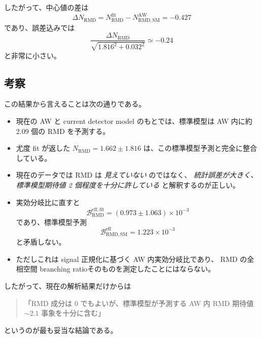\documentclass[a4paper,11pt]{jsarticle}
\begin{document}
したがって、中心値の差は
\[
\Delta N_{\mathrm{RMD}}
=
N_{\mathrm{RMD}}^{\mathrm{fit}} - N_{\mathrm{RMD,SM}}^{\mathrm{AW}}
= -0.427
\]
であり、誤差込みでは
\[
\frac{\Delta N_{\mathrm{RMD}}}
{\sqrt{1.816^2 + 0.032^2}}
\simeq -0.24
\]
と非常に小さい。

\subsection{考察}
この結果から言えることは次の通りである。
\begin{itemize}
  \item 現在の AW と current detector model のもとでは、標準模型は AW 内に約 2.09 個の RMD を予測する。
  \item 尤度 fit が返した \(N_{\mathrm{RMD}}=1.662\pm1.816\) は、この標準模型予測と完全に整合している。
  \item 現在のデータでは RMD は \emph{見えていない} のではなく、
        \emph{統計誤差が大きく、標準模型期待値 2 個程度を十分に許している} と解釈するのが正しい。
  \item 実効分岐比に直すと
        \[
        \mathcal{B}_{\mathrm{RMD}}^{\mathrm{eff,fit}}
        =
        (0.973 \pm 1.063)\times10^{-3}
        \]
        であり、標準模型予測
        \[
        \mathcal{B}_{\mathrm{RMD,SM}}^{\mathrm{eff}}
        =
        1.223\times10^{-3}
        \]
        と矛盾しない。
  \item ただしこれは signal 正規化に基づく AW 内実効分岐比であり、
        RMD の全相空間 branching ratioそのものを測定したことにはならない。
\end{itemize}

したがって、現在の解析結果だけからは
\begin{quote}
「RMD 成分は 0 でもよいが、標準模型が予測する AW 内 RMD 期待値 \(\sim 2.1\) 事象を十分に含む」
\end{quote}
というのが最も妥当な結論である。
\end{document}
